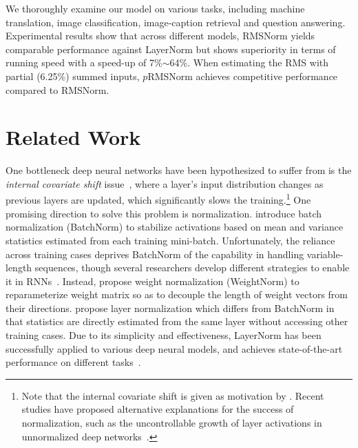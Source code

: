 \documentclass{article}
\begin{document}
We thoroughly examine our model on various tasks, including machine translation, image classification, image-caption retrieval and question answering. Experimental results show that across different models, RMSNorm yields comparable performance against LayerNorm but shows superiority in terms of running speed with a speed-up of 7\%$\sim$64\%. When estimating the RMS with partial (6.25\%) summed inputs, $p$RMSNorm achieves competitive performance compared to RMSNorm.

\section{Related Work}

One bottleneck deep neural networks have been hypothesized to suffer from is the \textit{internal covariate shift} issue~\cite{CIS-166708}, where a layer's input distribution changes as previous layers are updated, which significantly slows the training.\footnote{Note that the internal covariate shift is given as motivation by \cite{Ioffe:2015:BNA:3045118.3045167,ba2016layer}. Recent studies
have proposed alternative explanations for the success of normalization, such as the uncontrollable growth of layer activations in unnormalized deep networks~\cite{NIPS2018_7996}.} One promising direction to solve this problem is normalization. \citet{Ioffe:2015:BNA:3045118.3045167} introduce batch normalization (BatchNorm) to stabilize activations based on mean and variance statistics estimated from each training mini-batch. Unfortunately, the reliance across training cases deprives BatchNorm of the capability in handling variable-length sequences, though several researchers develop different strategies to enable it in RNNs~\cite{laurent2016batch,cooijmans2016recurrent}. Instead, \citet{NIPS2016_6114} propose weight normalization (WeightNorm) to reparameterize weight matrix so as to decouple the length of weight vectors from their directions. \citet{ba2016layer} propose layer normalization which differs from BatchNorm in that statistics are directly estimated from the same layer without accessing other training cases. Due to its simplicity and effectiveness, LayerNorm has been successfully applied to various deep neural models, and achieves state-of-the-art performance on different tasks~\cite{parmar2018image,zhou2018syllable,NIPS2017_7181,P18-1008}.
\end{document}
